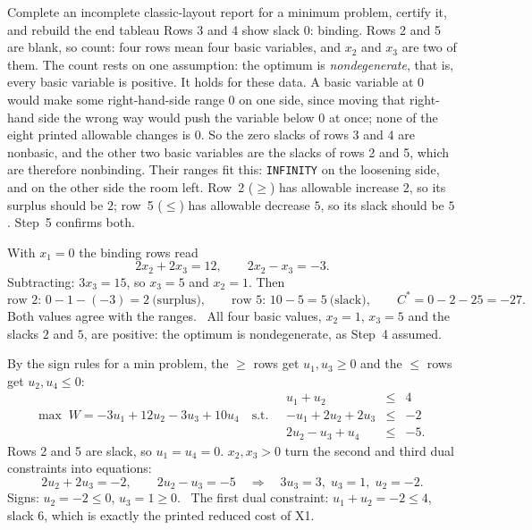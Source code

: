 \begin{worked}{Complete an incomplete classic-layout report for a minimum problem, certify it, and rebuild the end tableau}
Rows 3 and 4 show slack $0$: binding. Rows 2 and 5 are blank, so count:
four rows mean four basic variables, and $x_{2}$ and $x_{3}$ are two of
them. The count rests on one assumption: the optimum is
\emph{nondegenerate}, that is, every basic variable is positive. It holds
for these data. A basic variable at $0$ would make some right-hand-side
range $0$ on one side, since moving that right-hand side the wrong way
would push the variable below $0$ at once; none of the eight printed
allowable changes is $0$. So the zero slacks of rows 3 and 4 are
nonbasic, and the other two basic variables are the slacks of rows 2 and
5, which are therefore nonbinding. Their ranges fit this:
\texttt{INFINITY} on the loosening side, and on the other side the room
left. Row~2 ($\ge$) has allowable increase $2$, so its surplus should be
$2$; row~5 ($\le$) has allowable decrease $5$, so its slack should be $5$.
Step~5 confirms both.

With $x_{1}=0$ the binding rows read
\[
  2x_{2}+2x_{3}=12,\qquad 2x_{2}-x_{3}=-3 .
\]
Subtracting: $3x_{3}=15$, so $x_{3}=5$ and $x_{2}=1$. Then
\[
  \text{row 2: } 0-1-(-3)=2\ \text{(surplus)},\qquad
  \text{row 5: } 10-5=5\ \text{(slack)},\qquad
  C^{*}=0-2-25=-27 .
\]
Both values agree with the ranges. \checkmark\ All four basic values,
$x_{2}=1$, $x_{3}=5$ and the slacks $2$ and $5$, are positive: the optimum
is nondegenerate, as Step~4 assumed.

By the sign rules for a min problem, the $\ge$ rows get $u_{1},u_{3}\ge 0$
and the $\le$ rows get $u_{2},u_{4}\le 0$:
\[
  \max\; W=-3u_{1}+12u_{2}-3u_{3}+10u_{4}
  \quad\text{s.t.}\quad
  \begin{array}{rcl}
    u_{1}+u_{2} &\le& 4\\
    -u_{1}+2u_{2}+2u_{3} &\le& -2\\
    2u_{2}-u_{3}+u_{4} &\le& -5 .
  \end{array}
\]
Rows 2 and 5 are slack, so $u_{1}=u_{4}=0$. $x_{2},x_{3}>0$ turn the
second and third dual constraints into equations:
\[
  2u_{2}+2u_{3}=-2,\qquad 2u_{2}-u_{3}=-5
  \quad\Longrightarrow\quad 3u_{3}=3,\; u_{3}=1,\; u_{2}=-2 .
\]
Signs: $u_{2}=-2\le 0$, $u_{3}=1\ge 0$. \checkmark\ The first dual
constraint: $u_{1}+u_{2}=-2\le 4$, slack $6$, which is exactly the printed
reduced cost of X1. \checkmark


\end{worked}

